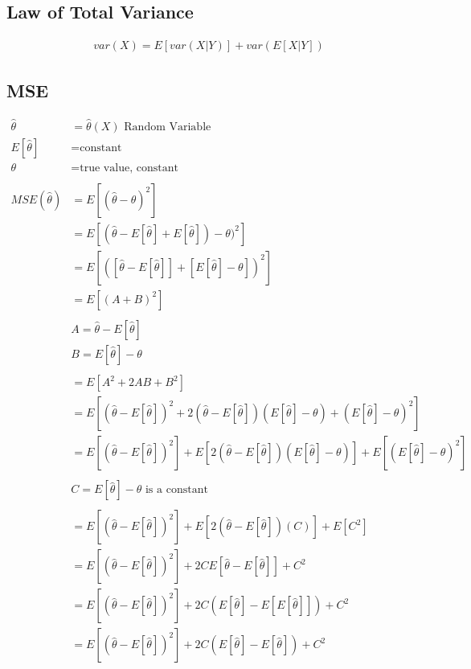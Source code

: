 \documentclass[]{article}
\begin{document}
\subsection {Law of Total Variance}
\begin{align}
var(X) = E[ var(X|Y) ] + var( E[X|Y] )
\end{align}

\subsection{MSE}

\begin{align}
	\hat{\theta} &= \hat{\theta}(X) \text{ Random Variable}\\
	E[\hat{\theta}] &= \text{constant}\\
	\theta &= \text{true value, constant}\\
	\\
	MSE(\hat{\theta}) &= E[(\hat{\theta} - \theta)^2]\\
	&= E[(\hat{\theta} - E[\hat{\theta}] + E[\hat{\theta}]) - \theta)^2]\\
	&= E[([\hat{\theta} - E[\hat{\theta}]] + [E[\hat{\theta}] - \theta])^2]\\
	&= E[(A + B)^2]\\
	\\
	& A = \hat{\theta} - E[\hat{\theta}]\\
	& B = E[\hat{\theta}] - \theta\\
	\\
	&= E[A^2 + 2AB + B^2]\\
	&= E[(\hat{\theta} - E[\hat{\theta}])^2 + 2(\hat{\theta} - E[\hat{\theta}])(E[\hat{\theta}] - \theta) + (E[\hat{\theta}] - \theta)^2]\\
	&= E[(\hat{\theta} - E[\hat{\theta}])^2] + E[2(\hat{\theta} - E[\hat{\theta}])(E[\hat{\theta}] - \theta)] + E[(E[\hat{\theta}] - \theta)^2]\\
	\\	
	& C = E[\hat{\theta}]  - \theta \text{ is a constant}\\
	\\
	&= E[(\hat{\theta} - E[\hat{\theta}])^2] + E[2(\hat{\theta} - E[\hat{\theta}])(C)] + E[C^2]\\
	&= E[(\hat{\theta} - E[\hat{\theta}])^2] + 2CE[\hat{\theta} - E[\hat{\theta}]] + C^2\\
	&= E[(\hat{\theta} - E[\hat{\theta}])^2] + 2C(E[\hat{\theta}] - E[E[\hat{\theta}]]) + C^2\\
	&= E[(\hat{\theta} - E[\hat{\theta}])^2] + 2C(E[\hat{\theta}] - E[\hat{\theta}]) + C^2\\	

\end{align}
\end{document}
